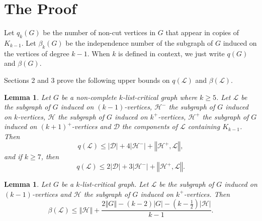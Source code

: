 \documentclass[10pt]{article}
\theoremstyle{plain}
\newtheorem{lem}[thm]{Lemma}
\theoremstyle{definition}
\theoremstyle{remark}
\newcommand{\fancy}[1]{\mathcal{#1}}
\newcommand{\D}{\fancy{D}}
\renewcommand{\L}{\fancy{L}}
\newcommand{\HH}{\fancy{H}}
\newcommand{\card}[1]{\left|#1\right|}
\newcommand{\size}[1]{\left\Vert#1\right\Vert}
\newcommand{\parens}[1]{\left( #1 \right)}
\def\D{\fancy{D}}
\begin{document}
\section{The Proof}
Let $q_k(G)$ be the number of non-cut vertices in $G$ that appear in copies of $K_{k-1}$.  Let $\beta_k(G)$ be the independence number of the subgraph of $G$ induced on the vertices of degree $k-1$.  
When $k$ is defined in context, we just write $q(G)$ and $\beta(G)$.

Sections 2 and 3 prove the following upper bounds on $q(\L)$ and $\beta(\L)$.
\begin{lem}\label{qLemmaList}
	Let $G$ be a non-complete $k$-list-critical graph where $k \ge 5$.  Let $\L$ be the subgraph of $G$ induced on $(k-1)$-vertices, $\HH^-$ the subgraph of $G$ induced on $k$-vertices, 
	$\HH$ the subgraph of $G$ induced on $k^+$-vertices, $\HH^+$ the subgraph of $G$ induced on $(k+1)^+$-vertices and $\D$ the components of $\L$ containing $K_{k-1}$.  Then
	\[q(\L) \le \card{\D} + 4\card{\HH^-} + \size{\HH^+, \L},\] and if $k \ge 7$, then
	\[q(\L) \le 2\card{\D} + 3\card{\HH^-} + \size{\HH^+, \L}.\]
\end{lem}

\begin{lem}\label{betaLemmaList}
	Let $G$ be a $k$-list-critical graph.  Let $\L$ be the subgraph of $G$ induced on $(k-1)$-vertices and	$\HH$ the subgraph of $G$ induced on $k^+$-vertices.  
	Then
	\[\beta(\L) \le \size{\HH} + \frac{2\size{G} - (k-2)\card{G} - \parens{k - \frac12}\card{\HH}}{k-1}.\]
\end{lem}
\end{document}
